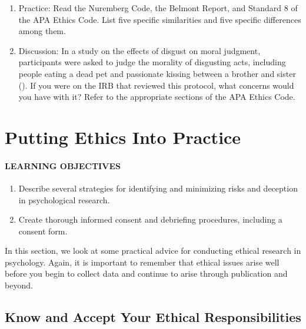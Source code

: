 \documentclass[
]{krantz}
\providecommand{\tightlist}{%
  \setlength{\itemsep}{0pt}\setlength{\parskip}{0pt}}
\begin{document}
\begin{enumerate}
\def\labelenumi{\arabic{enumi}.}
\tightlist
\item
  Practice: Read the Nuremberg Code, the Belmont Report, and Standard 8 of the APA Ethics Code. List five specific similarities and five specific differences among them.
\item
  Discussion: In a study on the effects of disgust on moral judgment, participants were asked to judge the morality of disgusting acts, including people eating a dead pet and passionate kissing between a brother and sister (). If you were on the IRB that reviewed this protocol, what concerns would you have with it? Refer to the appropriate sections of the APA Ethics Code.
\end{enumerate}

\section{Putting Ethics Into Practice}\label{putting-ethics-into-practice}

\paragraph*{LEARNING OBJECTIVES}\label{learning-objectives-24}

\begin{enumerate}
\def\labelenumi{\arabic{enumi}.}
\tightlist
\item
  Describe several strategies for identifying and minimizing risks and deception in psychological research.
\item
  Create thorough informed consent and debriefing procedures, including a consent form.
\end{enumerate}

In this section, we look at some practical advice for conducting ethical research in psychology. Again, it is important to remember that ethical issues arise well before you begin to collect data and continue to arise through publication and beyond.

\subsection*{Know and Accept Your Ethical Responsibilities}\label{know-and-accept-your-ethical-responsibilities}
\end{document}
